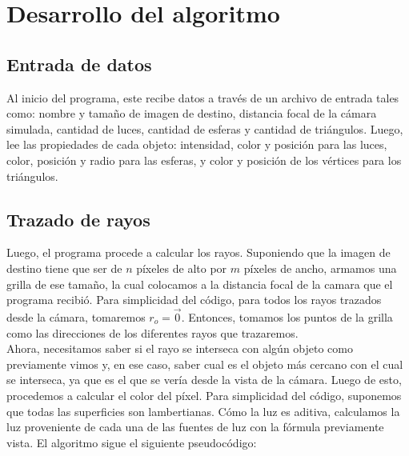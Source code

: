 \section{Desarrollo del algoritmo}

\subsection{Entrada de datos}

Al inicio del programa, este recibe datos a través de un archivo de entrada tales como: nombre y tamaño de imagen de destino, distancia focal de la cámara simulada, cantidad de luces, cantidad de esferas y cantidad de triángulos. Luego, lee las propiedades de cada objeto: intensidad, color y posición para las luces, color, posición y radio para las esferas, y color y posición de los vértices para los triángulos.

\subsection{Trazado de rayos}

Luego, el programa procede a calcular los rayos. Suponiendo que la imagen de destino tiene que ser de $n$ píxeles de alto por $m$ píxeles de ancho, armamos una grilla de ese tamaño, la cual colocamos a la distancia focal de la camara que el programa recibió. Para simplicidad del código, para todos los rayos trazados desde la cámara, tomaremos $r_o = \vec{0}$. Entonces, tomamos los puntos de la grilla como las direcciones de los diferentes rayos que trazaremos.\\
Ahora, necesitamos saber si el rayo se interseca con algún objeto como previamente vimos y, en ese caso, saber cual es el objeto más cercano con el cual se interseca, ya que es el que se vería desde la vista de la cámara. Luego de esto, procedemos a calcular el color del píxel. Para simplicidad del código, suponemos que todas las superficies son lambertianas. Cómo la luz es aditiva, calculamos la luz proveniente de cada una de las fuentes de luz con la fórmula previamente vista. El algoritmo sigue el siguiente pseudocódigo:


